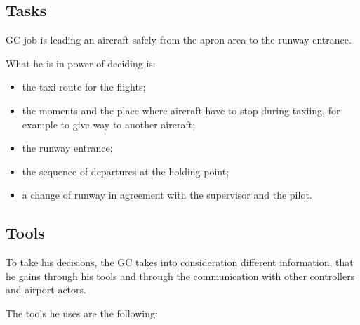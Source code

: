 \documentclass{article}
\begin{document}
\subsection{Tasks}

GC job is leading an aircraft safely from the apron area to the runway entrance. 

What he is in power of deciding is:
\begin{itemize}
	\item the taxi route for the flights;
	\item the moments and the place where aircraft have to stop during taxiing, for example to give way to another aircraft;
	\item the runway entrance;
	\item the sequence of departures at the holding point;
	\item a change of runway in agreement with the supervisor and the pilot.
\end{itemize}

\subsection{Tools}
To take his decisions, the GC takes into consideration different information, that he gains through his tools and through the communication with other controllers and airport actors.

The tools he uses are the following:
\end{document}
